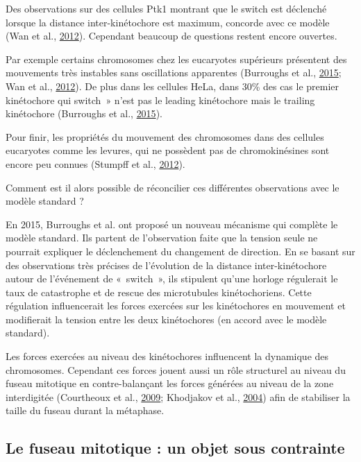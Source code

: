 \documentclass[12pt,a4paper,twoside,openright]{book}
\begin{document}
Des observations sur des cellules Ptk1 montrant que le switch est
déclenché lorsque la distance inter-kinétochore est maximum, concorde
avec ce modèle (Wan et al., \protect\hyperlink{ref-Wan2012}{2012}).
Cependant beaucoup de questions restent encore ouvertes.

Par exemple certains chromosomes chez les eucaryotes supérieurs
présentent des mouvements très instables sans oscillations apparentes
(Burroughs et al., \protect\hyperlink{ref-Burroughs2015}{2015}; Wan et
al., \protect\hyperlink{ref-Wan2012}{2012}). De plus dans les cellules
HeLa, dans 30\% des cas le premier kinétochore qui switch~» n'est pas le
leading kinétochore mais le trailing kinétochore (Burroughs et al.,
\protect\hyperlink{ref-Burroughs2015}{2015}).

Pour finir, les propriétés du mouvement des chromosomes dans des
cellules eucaryotes comme les levures, qui ne possèdent pas de
chromokinésines sont encore peu connues (Stumpff et al.,
\protect\hyperlink{ref-Stumpff2012}{2012}).

Comment est il alors possible de réconcilier ces différentes
observations avec le modèle standard ?

En 2015, Burroughs et al. ont proposé un nouveau mécanisme qui complète
le modèle standard. Ils partent de l'observation faite que la tension
seule ne pourrait expliquer le déclenchement du changement de direction.
En se basant sur des observations très précises de l'évolution de la
distance inter-kinétochore autour de l'événement de «~switch~», ils
stipulent qu'une horloge régulerait le taux de catastrophe et de rescue
des microtubules kinétochoriens. Cette régulation influencerait les
forces exercées sur les kinétochores en mouvement et modifierait la
tension entre les deux kinétochores (en accord avec le modèle standard).

Les forces exercées au niveau des kinétochores influencent la dynamique
des chromosomes. Cependant ces forces jouent aussi un rôle structurel au
niveau du fuseau mitotique en contre-balançant les forces générées au
niveau de la zone interdigitée (Courtheoux et al.,
\protect\hyperlink{ref-Courtheoux2009}{2009}; Khodjakov et al.,
\protect\hyperlink{ref-Khodjakov2004}{2004}) afin de stabiliser la
taille du fuseau durant la métaphase.

\subsection{Le fuseau mitotique : un objet sous
contrainte}\label{le-fuseau-mitotique-un-objet-sous-contrainte}
\end{document}
